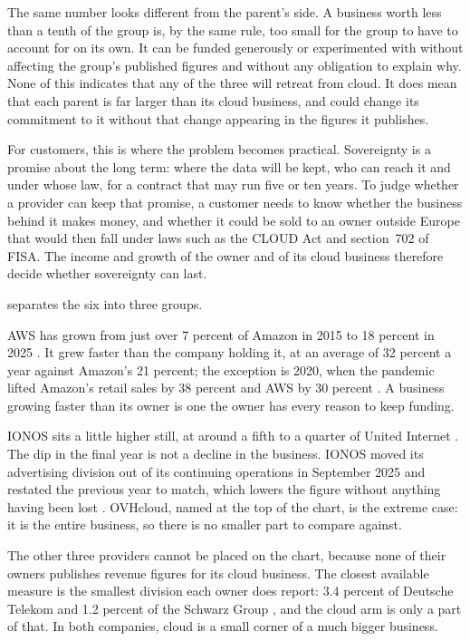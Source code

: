 The same number looks different from the parent's side. A business worth less
than a tenth of the group is, by the same rule, too small for the group to have
to account for on its own. It can be funded generously or experimented with without
affecting the group's published figures and without any obligation to explain why.
None of this indicates that any of the three will retreat from cloud. It does mean
that each parent is far larger than its cloud business, and could change its
commitment to it without that change appearing in the figures it publishes.

For customers, this is where the problem becomes practical. Sovereignty is a
promise about the long term: where the data will be kept, who can reach it and
under whose law, for a contract that may run five or ten years. To judge whether a
provider can keep that promise, a customer needs to know whether the business
behind it makes money, and whether it could be sold to an owner outside Europe that
would then fall under laws such as the \ac{CLOUD Act} and section~702 of \ac{FISA}.
The income and growth of the owner and of its cloud business therefore decide
whether sovereignty can last.


 separates the six into three groups.

\acs{AWS} has grown from just over 7 percent of Amazon in 2015 to 18 
percent in 2025 \cite{Amazon_10K_2017,Amazon_10K_2025}. It grew faster than the
company holding it, at an average of 32 percent a year against Amazon's
21 percent; the exception is 2020, when the pandemic lifted Amazon's retail sales by
38 percent and \acs{AWS} by 30 percent
\cite{Amazon_10K_2021}.  A business growing faster than
its owner is one the owner has every reason to keep funding.

IONOS sits a little higher still, at around a fifth to a quarter of United
Internet \cite{IONOS_AR_2025}. The dip in the final year is not a decline in the
business. IONOS moved its advertising division out of its continuing operations
in September 2025 and restated the previous year to match, which lowers the
figure without anything having been lost \cite{IONOS_AR_2025}. OVHcloud, named at
the top of the chart, is the extreme case: it is the entire business, so there is
no smaller part to compare against.

The other three providers cannot be placed on the chart, because none of their
owners publishes revenue figures for its cloud business. The closest available
measure is the smallest division each owner does report: 3.4 percent of
Deutsche Telekom \cite{DT_AR_2025} and 1.2 percent of the Schwarz Group
\cite{Schwarz_Figures_FY2025}, and the cloud arm is only a part of that. In both
companies, cloud is a small corner of a much bigger business.

